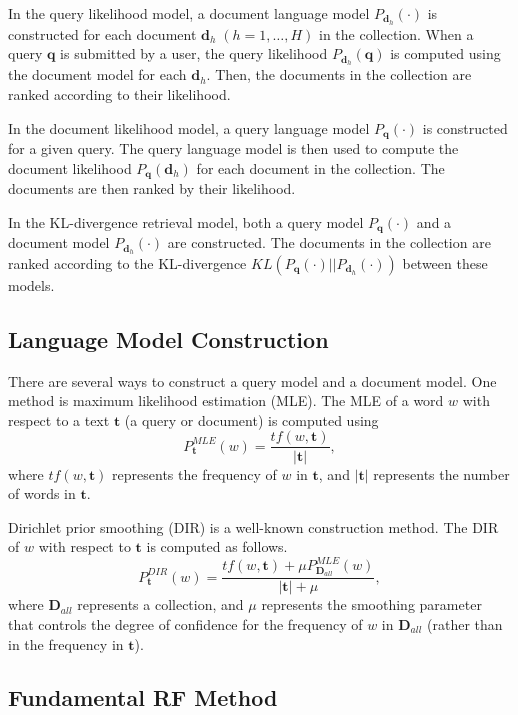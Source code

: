 \documentclass[english]{jnlp_1.4_rep}
\begin{document}
In the query likelihood model, a document language model
$P_{\bm{d}_{h}}(\cdot)$ is constructed for each document $\bm{d}_{h} \;
(h = 1, \dots, H)$ in the collection. When a query $\bm{q}$ is submitted
by a user, the query likelihood $P_{\bm{d}_{h}}(\bm{q})$ is computed
using the document model for each $\bm{d}_{h}$. Then, the documents in
the collection are ranked according to their likelihood.

In the document likelihood model, a query language model
$P_{\bm{q}}(\cdot)$ is constructed for a given query. The query language
model is then used to compute the document likelihood
$P_{\bm{q}}(\bm{d}_{h})$ for each document in the collection. The
documents are then ranked by their likelihood.

In the KL-divergence retrieval model, both a query model
$P_{\bm{q}}(\cdot)$ and a document model $P_{\bm{d}_{h}}(\cdot)$ are
constructed. The documents in the collection are ranked according to the
KL-divergence $KL(P_{\bm{q}}(\cdot)||P_{\bm{d}_{h}}(\cdot))$ between
these models.


\subsection{Language Model Construction}

There are several ways to construct a query model and a document
model. One method is maximum likelihood estimation (MLE). The MLE of a
word $w$ with respect to a text $\bm{t}$ (a query or document) is
computed using
\begin{equation}
 P^{MLE}_{\bm{t}}(w) = \frac{tf(w,\bm{t})}{|\bm{t}|},
\end{equation}
where $tf(w,\bm{t})$ represents the frequency of $w$ in $\bm{t}$, and
$|\bm{t}|$ represents the number of words in $\bm{t}$.

Dirichlet prior smoothing (DIR) \cite{Zhai2004} is a well-known
construction method. The DIR of $w$ with respect to $\bm{t}$ is computed
as follows.
\begin{equation}
 P^{DIR}_{\bm{t}}(w)
 =
 \frac
 {tf(w,\bm{t}) + \mu P^{MLE}_{\bm{D}_{all}}(w)}
 {|\bm{t}| + \mu},
\label{equ:dir}
\end{equation}
where $\bm{D}_{all}$ represents a collection, and $\mu$ represents the
smoothing parameter that controls the degree of confidence for the
frequency of $w$ in $\bm{D}_{all}$ (rather than in the frequency in
$\bm{t}$).


\subsection{Fundamental RF Method}
\end{document}

